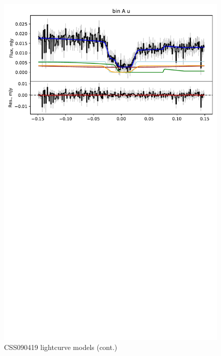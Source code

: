 \begin{figure}
    \centering
    \includegraphics[width=\textwidth]{figures/results/CSS090419/CSS090419_2.pdf}
    \caption{CSS090419 lightcurve models (cont.)}
    \label{fig:CSS090419 all lightcurves cont 1}
\end{figure}



